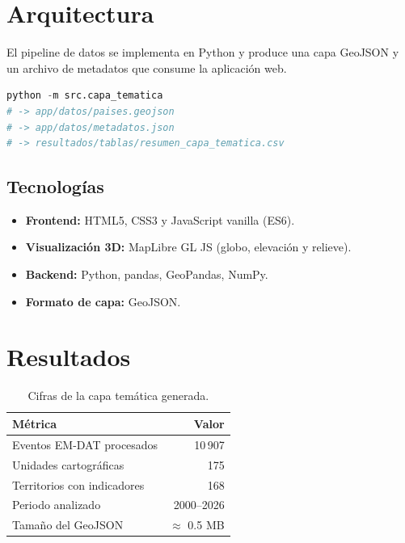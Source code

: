 \documentclass[11pt]{article}
\begin{document}
\section{Arquitectura}
El pipeline de datos se implementa en Python y produce una capa GeoJSON y
un archivo de metadatos que consume la aplicación web.

\begin{lstlisting}[language=Python, caption={Generación de la capa temática.}]
python -m src.capa_tematica
# -> app/datos/paises.geojson
# -> app/datos/metadatos.json
# -> resultados/tablas/resumen_capa_tematica.csv
\end{lstlisting}

\subsection{Tecnologías}
\begin{itemize}
  \item \textbf{Frontend:} HTML5, CSS3 y JavaScript vanilla (ES6).
  \item \textbf{Visualización 3D:} MapLibre GL JS (globo, elevación y relieve).
  \item \textbf{Backend:} Python, pandas, GeoPandas, NumPy.
  \item \textbf{Formato de capa:} GeoJSON.
\end{itemize}

\section{Resultados}
\begin{table}[H]
\centering
\caption{Cifras de la capa temática generada.}
\begin{tabular}{@{}lr@{}}
\toprule
\textbf{Métrica} & \textbf{Valor} \\
\midrule
Eventos EM-DAT procesados & 10\,907 \\
Unidades cartográficas & 175 \\
Territorios con indicadores & 168 \\
Periodo analizado & 2000--2026 \\
Tamaño del GeoJSON & $\approx$ 0.5 MB \\
\bottomrule
\end{tabular}
\end{table}
\end{document}
